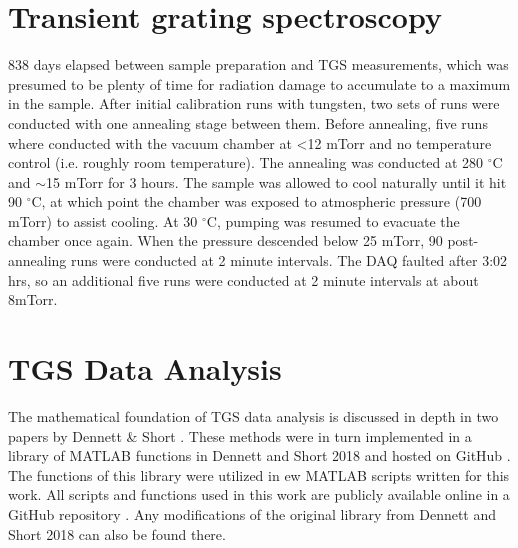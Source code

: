 %
%
\section{Transient grating spectroscopy}
838 days elapsed between sample preparation and TGS measurements, which was presumed to be plenty of time for radiation damage to accumulate to a maximum in the sample. After initial calibration runs with tungsten, two sets of runs were conducted with one annealing stage between them. Before annealing, five runs where conducted with the vacuum chamber at <12 mTorr and no temperature control (i.e. roughly room temperature). The annealing was conducted at 280 $^\circ$C and $\sim$15 mTorr for 3 hours. The sample was allowed to cool naturally until it hit 90 $^\circ$C, at which point the chamber was exposed to atmospheric pressure (700 mTorr) to assist cooling. At 30 $^\circ$C, pumping was resumed to evacuate the chamber once again. When the pressure descended below 25 mTorr, 90 post-annealing runs were conducted at 2 minute intervals. The DAQ faulted after 3:02 hrs, so an additional five runs were conducted at 2 minute intervals at about 8mTorr.

\section{TGS Data Analysis}
The mathematical foundation of TGS data analysis is discussed in depth in two papers by Dennett \& Short \cite{Dennett2017, Dennett2018}. These methods were in turn implemented in a library of MATLAB functions in Dennett and Short 2018 and hosted on GitHub \cite{dennett_short_github}. The functions of this library were utilized in ew MATLAB scripts written for this work. All scripts and functions used in this work are publicly available online in a GitHub repository \cite{Sergheyev2019}. Any modifications of the original library from Dennett and Short 2018 can also be found there.

